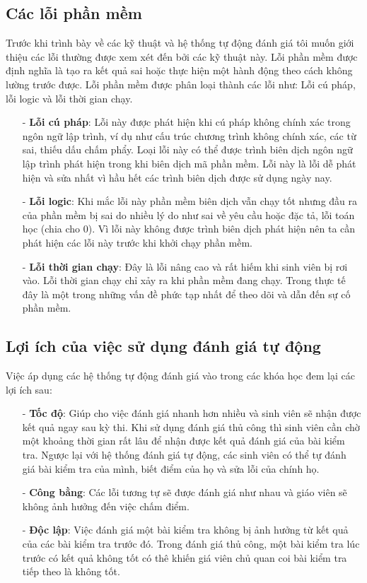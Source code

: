 \documentclass[12pt,a4paper]{article}
\begin{document}
\subsection{Các lỗi phần mềm}
Trước khi trình bày về các kỹ thuật và hệ thống tự động đánh giá tôi muốn giới thiệu các lỗi thường được xem xét đến bởi các kỹ thuật này. Lỗi phần mềm được định nghĩa là tạo ra kết quả sai hoặc thực hiện một hành động theo cách không lường trước được. Lỗi phần mềm được phân loại thành các lỗi như: Lỗi cú pháp, lỗi logic và lỗi thời gian chạy.
\begin{itemize}
\item[-] \textbf{Lỗi cú pháp}: Lỗi này được phát hiện khi cú pháp không chính xác trong ngôn ngữ lập trình, ví dụ như cấu trúc chương trình không chính xác, các từ sai, thiếu dấu chấm phẩy. Loại lỗi này có thể được trình biên dịch ngôn ngữ lập trình phát hiện trong khi biên dịch mã phần mềm. Lỗi này là lỗi dễ phát hiện và sửa nhất vì hầu hết các trình biên dịch được sử dụng ngày nay.\newline
\item[-] \textbf{Lỗi logic}: Khi mắc lỗi này phần mềm biên dịch vẫn chạy tốt nhưng đầu ra của phần mềm bị sai do nhiều lý do như sai về yêu cầu hoặc đặc tả, lỗi toán học (chia cho 0). Vì lỗi này không được trình biên dịch phát hiện nên ta cần phát hiện các lỗi này trước khi khởi chạy phần mềm.\newline
\item[-] \textbf{Lỗi thời gian chạy}: Đây là lỗi nâng cao và rất hiếm khi sinh viên bị rơi vào. Lỗi thời gian chạy chỉ xảy ra khi phần mềm đang chạy. Trong thực tế đây là một trong những vấn đề phức tạp nhất để theo dõi và dẫn đến sự cố phần mềm.\newline
\end{itemize}
\subsection{Lợi ích của việc sử dụng đánh giá tự động}
Việc áp dụng các hệ thống tự động đánh giá vào trong các khóa học đem lại các lợi ích sau:
\begin{itemize}
\item[-] \textbf{Tốc độ}: Giúp cho việc đánh giá nhanh hơn nhiều và sinh viên sẽ nhận được kết quả ngay sau kỳ thi. Khi sử dụng đánh giá thủ công thì sinh viên cần chờ một khoảng thời gian rất lâu để nhận được kết quả đánh giá của bài kiểm tra. Ngược lại với hệ thống đánh giá tự động, các sinh viên có thể tự đánh giá bài kiểm tra của mình, biết điểm của họ và sửa lỗi của chính họ.
\item[-] \textbf{Công bằng}: Các lỗi tương tự sẽ được đánh giá như nhau và giáo viên sẽ không ảnh hưởng đến việc chấm điểm.
\item[-] \textbf{Độc lập}: Việc đánh giá một bài kiểm tra không bị ảnh hưởng từ kết quả của các bài kiểm tra trước đó. Trong đánh giá thủ công, một bài kiểm tra lúc trước có kết quả không tốt có thê khiến giá viên chủ quan coi bài kiểm tra tiếp theo là không tốt.
\end{itemize}
\end{document}
